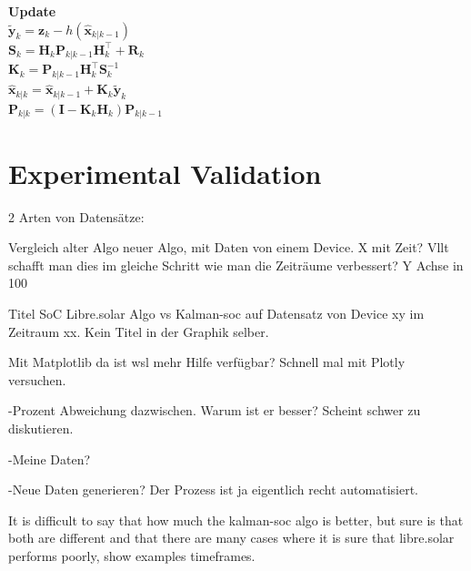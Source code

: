 \textbf{Update} \\
${\tilde  {{\boldsymbol  {y}}}}_{{k}}={\boldsymbol  {z}}_{{k}}-h({\hat  {{\boldsymbol  {x}}}}_{{k|k-1}})$ \\
${\boldsymbol  {S}}_{{k}}={{{\boldsymbol  {H}}_{{k}}}}{\boldsymbol  {P}}_{{k|k-1}}{{{\boldsymbol  {H}}_{{k}}^{\top }}}+{\boldsymbol  {R}}_{{k}}$ \\
${\boldsymbol  {K}}_{{k}}={\boldsymbol  {P}}_{{k|k-1}}{{{\boldsymbol  {H}}_{{k}}^{\top }}}{\boldsymbol  {S}}_{{k}}^{{-1}}$ \\
${\hat  {{\boldsymbol  {x}}}}_{{k|k}}={\hat  {{\boldsymbol  {x}}}}_{{k|k-1}}+{\boldsymbol  {K}}_{{k}}{\tilde  {{\boldsymbol  {y}}}}_{{k}}$ \\
${\boldsymbol  {P}}_{{k|k}}=({\boldsymbol  {I}}-{\boldsymbol  {K}}_{{k}}{{{\boldsymbol  {H}}_{{k}}}}){\boldsymbol  {P}}_{{k|k-1}}$ \\





\chapter{Experimental Validation}

2 Arten von Datensätze: 



Vergleich alter Algo neuer Algo, mit Daten von einem Device. X mit Zeit? Vllt schafft man dies im gleiche Schritt wie man die Zeiträume verbessert? Y Achse in 100%

Titel SoC Libre.solar Algo vs Kalman-soc auf Datensatz von Device xy im Zeitraum xx. Kein Titel in der Graphik selber. 

Mit Matplotlib da ist wsl mehr Hilfe verfügbar? Schnell mal mit Plotly versuchen. 



-Prozent Abweichung dazwischen. Warum ist er besser? Scheint schwer zu diskutieren.



-Meine Daten? 



-Neue Daten generieren? Der Prozess ist ja eigentlich recht automatisiert. 



It is difficult to say that how much the kalman-soc algo is better, but sure is that both are different and that there are many cases where it is sure that libre.solar performs poorly, show examples timeframes.

